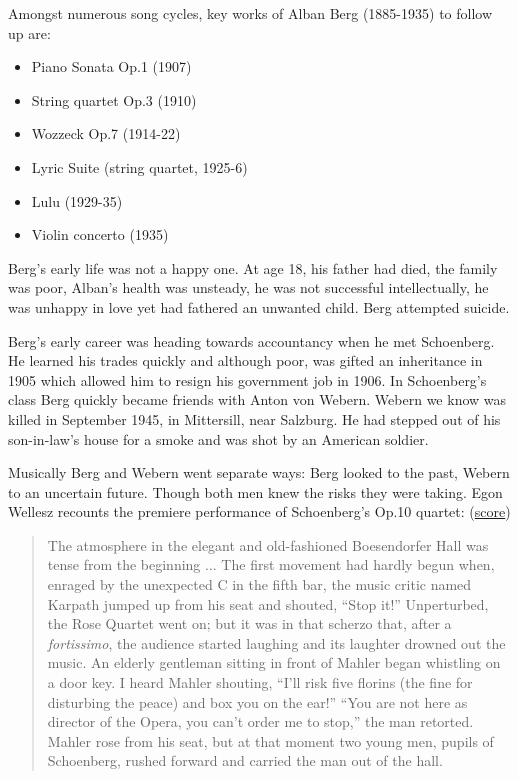 Amongst numerous song cycles, key works of Alban Berg (1885-1935) to follow up are:
\begin{itemize}
\item Piano Sonata Op.1 (1907)
\item String quartet Op.3 (1910)
\item Wozzeck Op.7 (1914-22)
\item Lyric Suite (string quartet, 1925-6)
\item Lulu (1929-35)
\item Violin concerto (1935) 
\end{itemize}

Berg's early life was not a happy one. At age 18, his father had died, the family was poor, Alban's health was unsteady, he was not successful intellectually, he was unhappy in love yet had fathered an unwanted child. Berg attempted suicide. 

Berg's early career was heading towards accountancy when he met Schoenberg. He learned his trades quickly and although poor, was gifted an inheritance in 1905 which allowed him to resign his government job in 1906. In Schoenberg's class Berg quickly became friends with Anton von Webern. Webern we know was killed in September 1945, in Mittersill, near Salzburg. He had stepped out of his son-in-law's house for a smoke and was shot by an American soldier. 

Musically Berg and Webern went separate ways: Berg looked to the past, Webern to an uncertain future. Though both men knew the risks they were taking. Egon Wellesz recounts the premiere performance of Schoenberg's Op.10 quartet: (\href{http://conquest.imslp.info/files/imglnks/usimg/c/c1/IMSLP29725-PMLP66179-Schoenberg_-_SQ_No._2_score.pdf}{score})

\begin{quotation}
The atmosphere in the elegant and old-fashioned Boesendorfer Hall was tense from the beginning ... The first 
movement had hardly begun when, enraged by the unexpected C in the fifth bar, the music critic named Karpath 
jumped up from his seat and shouted, ``Stop it!'' Unperturbed, the Rose Quartet went on; but it was in that 
scherzo that, after a \textit{fortissimo}, the audience started laughing and its laughter drowned out the 
music. An elderly gentleman sitting in front of Mahler began whistling on a door key. I heard Mahler 
shouting, ``I'll risk five florins (the fine for disturbing the peace) and box you on the ear!'' ``You are 
not here as director of the Opera, you can't order me to stop,'' the man retorted. Mahler rose from his seat, 
but at that moment two young men, pupils of Schoenberg, rushed forward and carried the man out of the hall.
\end{quotation}

